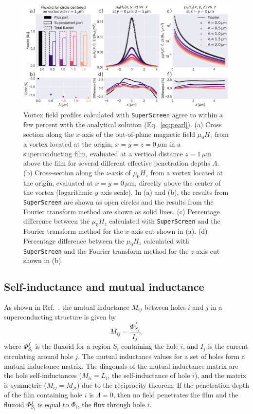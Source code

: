 \documentclass[final,3p,times]{elsarticle}
\newcommand{\inline}[1]{\texttt{#1}\xspace}
\newcommand{\SuperScreen}{\inline{SuperScreen}}
\begin{document}
\begin{figure}
    \centering
    \includegraphics[width=\textwidth]{examples/images/pearl.pdf}
    \caption{Vortex field profiles calculated with \SuperScreen agree to within a few percent with the analytical solution (Eq.~\ref{eq:pearl}). (a) Cross section along the $x$-axis of the out-of-plane magnetic field $\mu_0H_z$ from a vortex located at the origin, $x=y=z=0\,\mu\mathrm{m}$ in a superconducting film, evaluated at a vertical distance $z=1\,\mu\mathrm{m}$ above the film for several different effective penetration depths $\Lambda$. (b) Cross-section along the $z$-axis of $\mu_0H_z$ from a vortex located at the origin, evaluated at $x=y=0\,\mu\mathrm{m}$, directly above the center of the vortex (logarithmic $y$ axis scale). In (a) and (b), the results from \SuperScreen are shown as open circles and the results from the Fourier transform method are shown as solid lines. (c) Percentage difference between the $\mu_0H_z$ calculated with \SuperScreen and the Fourier transform method for the $x$-axis cut shown in (a). (d) Percentage difference between the $\mu_0H_z$ calculated with \SuperScreen and the Fourier transform method for the $z$-axis cut shown in (b).}
    \label{fig:pearl}
\end{figure}

\subsection{Self-inductance and mutual inductance}
\label{section:examples:mutual-inductance}

As shown in Ref.~\cite{Brandt2005-wj}, the mutual inductance $M_{ij}$ between holes $i$ and $j$ in a superconducting structure is given by
\begin{equation}
    M_{ij}=\frac{\Phi^f_{S_i}}{I_j},
\end{equation}
where $\Phi^f_{S_i}$ is the fluxoid for a region $S_i$ containing the hole $i$, and $I_j$ is the current circulating around hole $j$. The mutual inductance values for a set of holes form a mutual inductance matrix. The diagonals of the mutual inductance matrix are the hole self-inductances ($M_{ii}=L_i$, the self-inductance of hole $i$), and the matrix is symmetric ($M_{ij}=M_{ji}$) due to the reciprocity theorem. If the penetration depth of the film containing hole $i$ is $\Lambda = 0$, then no field penetrates the film and the fluxoid $\Phi^f_{S_i}$ is equal to $\Phi_i$, the flux through hole $i$.
\end{document}

